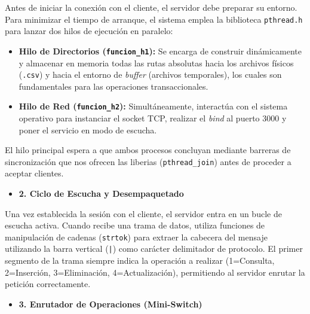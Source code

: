 \documentclass[12pt]{article}
\begin{document}
Antes de iniciar la conexión con el cliente, el servidor debe preparar su entorno. Para minimizar el tiempo de arranque, el sistema emplea la biblioteca \texttt{pthread.h} para lanzar dos hilos de ejecución en paralelo:
\begin{itemize}
    \item \textbf{Hilo de Directorios (\texttt{funcion\_h1}):} Se encarga de construir dinámicamente y almacenar en memoria todas las rutas absolutas hacia los archivos físicos (\texttt{.csv}) y hacia el entorno de \textit{buffer} (archivos temporales), los cuales son fundamentales para las operaciones transaccionales.
    \item \textbf{Hilo de Red (\texttt{funcion\_h2}):} Simultáneamente, interactúa con el sistema operativo para instanciar el socket TCP, realizar el \textit{bind} al puerto 3000 y poner el servicio en modo de escucha.
\end{itemize}
El hilo principal espera a que ambos procesos concluyan mediante barreras de sincronización que nos ofrecen las liberias (\texttt{pthread\_join}) antes de proceder a aceptar clientes.

\begin{itemize}[label=]
    \item \textbf{2. Ciclo de Escucha y Desempaquetado}
\end{itemize}

Una vez establecida la sesión con el cliente, el servidor entra en un bucle de escucha activa. Cuando recibe una trama de datos, utiliza funciones de manipulación de cadenas (\texttt{strtok}) para extraer la cabecera del mensaje utilizando la barra vertical (\texttt{|}) como carácter delimitador de protocolo. El primer segmento de la trama siempre indica la operación a realizar (1=Consulta, 2=Inserción, 3=Eliminación, 4=Actualización), permitiendo al servidor enrutar la petición correctamente.

\begin{itemize}[label=]
    \item \textbf{3. Enrutador de Operaciones (Mini-Switch)}
\end{itemize}
\end{document}
